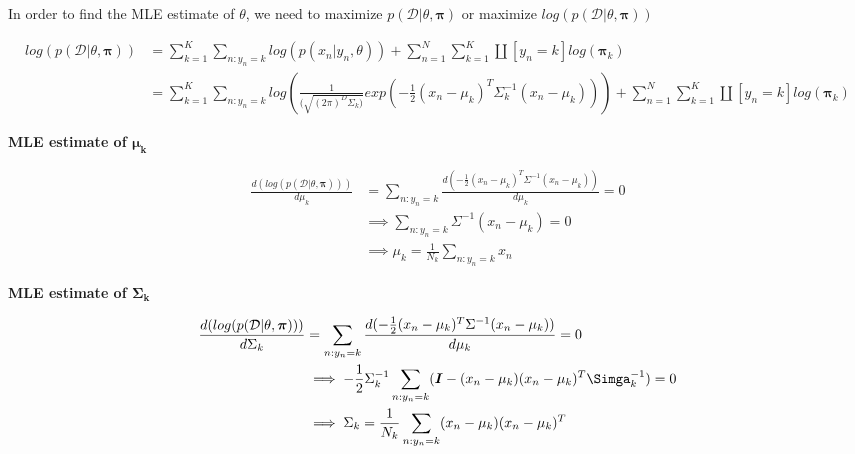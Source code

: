 \documentclass{article}
\begin{document}
\begin{addmargin}{1.5em}
\begin{addmargin}{1.5em}
\begin{addmargin}{1.5em}
            In order to find the MLE estimate of $\theta$, we need to maximize $p(\mathcal{D} | \theta, \boldsymbol{\pi})$ or maximize $log(p(\mathcal{D} | \theta, \boldsymbol{\pi}))$
            
            \begin{align*}
                log(p(\mathcal{D} | \theta, \boldsymbol{\pi})) &= \sum_{k = 1}^{K} \sum_{n:y_n = k} log(p(x_n | y_n, \theta)) + \sum_{n = 1}^{N} \sum_{k = 1}^{K} \amalg[y_n = k] log(\boldsymbol{\pi}_k) \\
                                                               &= \sum_{k = 1}^{K} \sum_{n:y_n = k} log(\frac{1}{(\sqrt{(2\pi)^{D}\Sigma_k)}}exp(-\frac{1}{2}(x_n - \mu_k)^T\Sigma_k^{-1}(x_n - \mu_k))) + \sum_{n = 1}^{N} \sum_{k = 1}^{K} \amalg[y_n = k] log(\boldsymbol{\pi}_k)
            \end{align*}
            
            \textbf{MLE estimate of $\boldsymbol{\mu_k}$}
            
            \begin{align*}
                \frac{d(log(p(\mathcal{D} | \theta, \boldsymbol{\pi})))}{d\mu_k} &= \sum_{n:y_n = k} \frac{d(-\frac{1}{2}(x_n - \mu_k)^T\Sigma^{-1}(x_n - \mu_k))}{d\mu_k} = 0 \\
                                                                                 &\implies \sum_{n:y_n = k} \Sigma^{-1}(x_n - \mu_k) = 0 \\
                                                                                 &\implies \mu_k = \frac{1}{N_k} \sum_{n:y_n = k} x_n
            \end{align*}
            
            \textbf{MLE estimate of $\boldsymbol{\Sigma_k}$}

            \begin{align*}
                \frac{d(log(p(\mathcal{D} | \theta, \boldsymbol{\pi})))}{d\Sigma_k} &= \sum_{n:y_n = k} \frac{d(-\frac{1}{2}(x_n - \mu_k)^T\Sigma^{-1}(x_n - \mu_k))}{d\mu_k} = 0 \\
                                                                                    &\implies -\frac{1}{2}\Sigma_k^{-1} \sum_{n:y_n = k} (\boldsymbol{I} - (x_n - \mu_k)(x_n - \mu_k)^T\Simga_k^{-1}) = 0 \\
                                                                                    &\implies \Sigma_k = \frac{1}{N_k} \sum_{n:y_n = k} (x_n - \mu_k)(x_n - \mu_k)^T
            \end{align*}
            

\end{addmargin}
\end{addmargin}
\end{addmargin}
\end{document}
